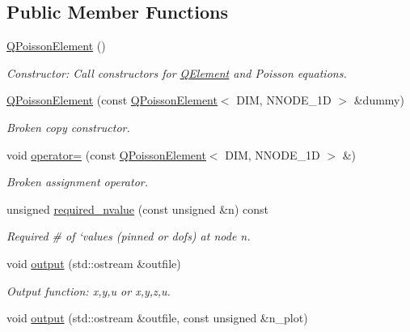 \subsection*{Public Member Functions}
\begin{DoxyCompactItemize}
\item 
\hyperlink{classoomph_1_1QPoissonElement_a64b6a13f87ce6f9b39cca767c948986f}{Q\+Poisson\+Element} ()
\begin{DoxyCompactList}\small\item\em Constructor\+: Call constructors for \hyperlink{classoomph_1_1QElement}{Q\+Element} and Poisson equations. \end{DoxyCompactList}\item 
\hyperlink{classoomph_1_1QPoissonElement_a20de2b0a6228fe3ad7e86d03d95651ad}{Q\+Poisson\+Element} (const \hyperlink{classoomph_1_1QPoissonElement}{Q\+Poisson\+Element}$<$ D\+IM, N\+N\+O\+D\+E\+\_\+1D $>$ \&dummy)
\begin{DoxyCompactList}\small\item\em Broken copy constructor. \end{DoxyCompactList}\item 
void \hyperlink{classoomph_1_1QPoissonElement_a944130c3b41dd3767999664686d10e93}{operator=} (const \hyperlink{classoomph_1_1QPoissonElement}{Q\+Poisson\+Element}$<$ D\+IM, N\+N\+O\+D\+E\+\_\+1D $>$ \&)
\begin{DoxyCompactList}\small\item\em Broken assignment operator. \end{DoxyCompactList}\item 
unsigned \hyperlink{classoomph_1_1QPoissonElement_a2ed068f90e2e7c576f44098a9bec08a6}{required\+\_\+nvalue} (const unsigned \&n) const
\begin{DoxyCompactList}\small\item\em Required \# of `values\textquotesingle{} (pinned or dofs) at node n. \end{DoxyCompactList}\item 
void \hyperlink{classoomph_1_1QPoissonElement_a8ca8f7f4c9e4ba9f5558391a8e22d170}{output} (std\+::ostream \&outfile)
\begin{DoxyCompactList}\small\item\em Output function\+: x,y,u or x,y,z,u. \end{DoxyCompactList}\item 
void \hyperlink{classoomph_1_1QPoissonElement_a1b9e0f365936b175ed3405369f05b4af}{output} (std\+::ostream \&outfile, const unsigned \&n\+\_\+plot)

\end{DoxyCompactItemize}
